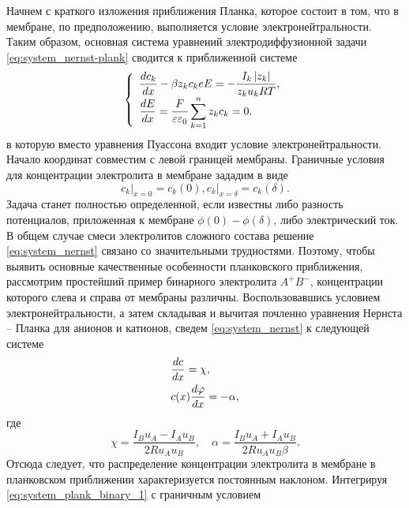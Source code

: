 Начнем с краткого изложения приближения Планка, которое состоит в том, что
в мембране, по предположению, выполняется условие электронейтральности. Таким
образом, основная система уравнений электродиффузионной задачи
\eqref{eq:system_nernst-plank} сводится к приближенной системе
\begin{equation}
    \left\{
    \begin{array}{l}
        \displaystyle \frac{d c_k}{d x} - \beta z_k c_k e E =
            - \frac{I_k\left| z_k \right|}{z_k u_k RT},\\
        \displaystyle \frac{d E}{d x} = \frac{F}{\varepsilon\varepsilon_0}\sum_{k=1}^n z_k c_k = 0.
\end{array}
\right.
\label{eq:system_nernst}
\end{equation}
в которую вместо уравнения Пуассона входит условие электронейтральности. Начало
координат совместим с левой границей мембраны. Граничные условия для
концентрации электролита в мембране зададим в виде
\begin{equation}
    \left.c_k\right|_{x=0} = c_k(0), \left.c_k\right|_{x=\delta} = c_k(\delta).
    \label{eq:boundary_conditions}
\end{equation}
Задача станет полностью определенной, если известны либо разность потенциалов,
приложенная к мембране \( \phi(0) - \phi(\delta) \), либо электрический ток.
В общем случае смеси электролитов сложного состава решение
\eqref{eq:system_nernst} связано со значительными трудностями. Поэтому, чтобы
выявить основные качественные особенности планковского приближения, рассмотрим
простейший пример бинарного электролита \( A^+B^- \), концентрации которого
слева и справа от мембраны различны. Воспользовавшись условием
электронейтральности, а затем складывая и вычитая почленно уравнения
Нернста -- Планка для анионов и катионов, сведем \eqref{eq:system_nernst} к
следующей системе
\begin{align}
    & \frac{d c}{d x} = \chi,              \label{eq:system_plank_binary_1}\\
    & c(x)\frac{d \varphi}{d x} = -\alpha,    \label{eq:system_plank_binary_2}
\end{align}
где
\begin{equation}
    \chi = \frac{I_B u_A - I_A u_B}{2Ru_Au_B},\quad
    \alpha = \frac{I_B u_A + I_A u_B}{2Ru_Au_B\beta}.
    \label{eq:system_plank_binary_subs}
\end{equation}
Отсюда следует, что распределение концентрации электролита в мембране в
планковском приближении характеризуется постоянным наклоном. Интегрируя
\eqref{eq:system_plank_binary_1} с граничным условием
